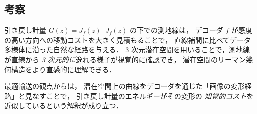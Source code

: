 \subsection{考察}

引き戻し計量 $G(z) = J_f(z)^\top J_f(z)$ の下での測地線は，
デコーダ $f$ が感度の高い方向への移動コストを大きく見積もることで，
直線補間に比べてデータ多様体に沿った自然な経路を与える．
3 次元潜在空間を用いることで，測地線が直線から
\emph{3 次元的に}逸れる様子が視覚的に確認でき，
潜在空間のリーマン幾何構造をより直感的に理解できる．

最適輸送の観点からは，
潜在空間上の曲線をデコーダを通じた「画像の変形経路」と見なすことで，
引き戻し計量のエネルギーがその変形の
\emph{知覚的コスト}を近似しているという解釈が成り立つ．
